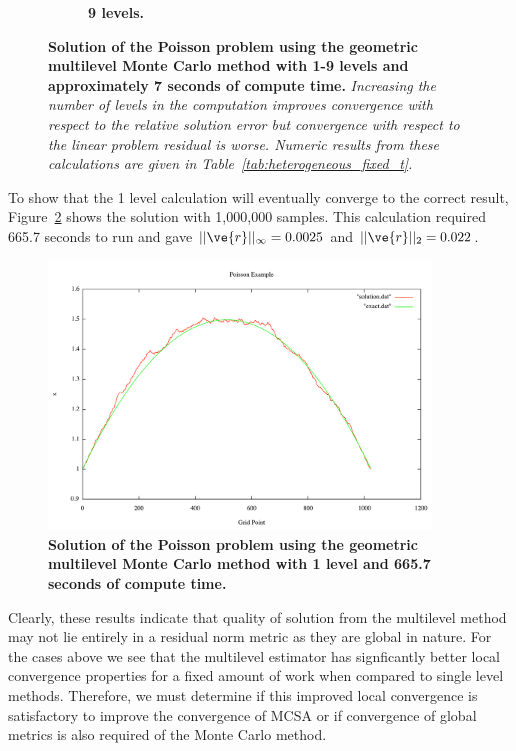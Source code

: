\documentclass[note]{TechNote}
\begin{document}
\begin{figure}[h!]
\begin{subfigure}[b]{0.32\textwidth}
    \caption{\textbf{9 levels.}}
  \end{subfigure}
  \caption{\textbf{Solution of the Poisson problem using the geometric
      multilevel Monte Carlo method with 1-9 levels and approximately
      7 seconds of compute time.} \textit{Increasing the number of
      levels in the computation improves convergence with respect to
      the relative solution error but convergence with respect to the
      linear problem residual is worse. Numeric results from these
      calculations are given in
      Table~\ref{tab:heterogeneous_fixed_t}.}}
  \label{fig:heterogeneous_fixed_t}
\end{figure}

To show that the 1 level calculation will eventually converge to the
correct result, Figure~\ref{fig:converged_1_level} shows the solution
with 1,000,000 samples. This calculation required 665.7 seconds to run
and gave $||\ve{r}||_\infty = 0.0025$ and $||\ve{r}||_2 = 0.022$.
\begin{figure}[h!]
  \begin{center}
    \includegraphics[width=4in]{converged_1_level.pdf}
  \end{center}
  \caption{\textbf{Solution of the Poisson problem using the geometric
      multilevel Monte Carlo method with 1 level and 665.7 seconds of
      compute time.}}
  \label{fig:converged_1_level}
\end{figure}

Clearly, these results indicate that quality of solution from the
multilevel method may not lie entirely in a residual norm metric as
they are global in nature. For the cases above we see that the
multilevel estimator has signficantly better local convergence
properties for a fixed amount of work when compared to single level
methods. Therefore, we must determine if this improved local
convergence is satisfactory to improve the convergence of MCSA or if
convergence of global metrics is also required of the Monte Carlo
method.
\end{document}
